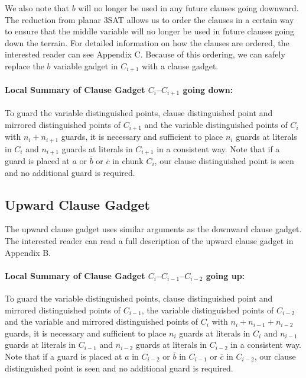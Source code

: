 \documentclass[11pt]{article}
\begin{document}
We also note that $b$ will no longer be used in any future clauses going downward.  The reduction from planar 3SAT allows us to order the clauses in a certain way to ensure that the middle variable will no longer be used in future clauses going down the terrain.  For detailed information on how the clauses are ordered, the interested reader can see Appendix C.  Because of this ordering, we can safely replace the $b$ variable gadget in $C_{i+1}$ with a clause gadget.

\paragraph{Local Summary of Clause Gadget $C_i$--$C_{i+1}$ going down:}  To guard the variable distinguished points, clause distinguished point and mirrored distinguished points of $C_{i+1}$ and the variable distinguished points of $C_i$ with $n_i + n_{i+1}$ guards, it is necessary and sufficient to place $n_i$ guards at literals in $C_i$ and $n_{i+1}$ guards at literals in $C_{i+1}$ in a consistent way.  Note that if a guard is placed at $a$ or $\overline{b}$ or $\overline{c}$ in chunk $C_i$, our clause distinguished point is seen and no additional guard is required.



\subsection{Upward Clause Gadget}

The upward clause gadget uses similar arguments as the downward clause gadget.  The interested reader can read a full description of the upward clause gadget in Appendix B. 

\paragraph{Local Summary of Clause Gadget $C_i$--$C_{i-1}$--$C_{i-2}$ going up:}  To guard the variable distinguished points, clause distinguished point and mirrored distinguished points of $C_{i-1}$, the variable distinguished points of $C_{i-2}$ and the variable and mirrored distinguished points of $C_i$ with $n_i + n_{i-1} + n_{i-2}$ guards, it is necessary and sufficient to place $n_i$ guards at literals in $C_i$ and $n_{i-1}$ guards at literals in $C_{i-1}$ and $n_{i-2}$ guards at literals in $C_{i-2}$ in a consistent way.  Note that if a guard is placed at $a$ in $C_{i-2}$ or $\overline{b}$ in $C_{i-1}$ or $\overline{c}$ in $C_{i-2}$, our clause distinguished point is seen and no additional guard is required.
\end{document}
